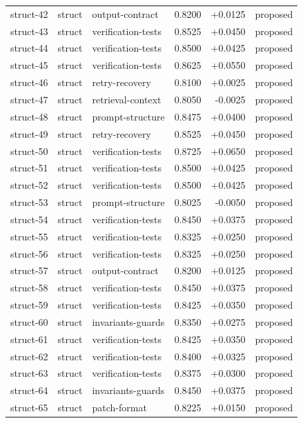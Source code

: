 \begin{center}
\begin{longtable}{llp{5.2cm}rrl}
struct-42 & struct & output-contract & 0.8200 & +0.0125 & proposed \\
struct-43 & struct & verification-tests & 0.8525 & +0.0450 & proposed \\
struct-44 & struct & verification-tests & 0.8500 & +0.0425 & proposed \\
struct-45 & struct & verification-tests & 0.8625 & +0.0550 & proposed \\
struct-46 & struct & retry-recovery & 0.8100 & +0.0025 & proposed \\
struct-47 & struct & retrieval-context & 0.8050 & -0.0025 & proposed \\
struct-48 & struct & prompt-structure & 0.8475 & +0.0400 & proposed \\
struct-49 & struct & retry-recovery & 0.8525 & +0.0450 & proposed \\
struct-50 & struct & verification-tests & 0.8725 & +0.0650 & proposed \\
struct-51 & struct & verification-tests & 0.8500 & +0.0425 & proposed \\
struct-52 & struct & verification-tests & 0.8500 & +0.0425 & proposed \\
struct-53 & struct & prompt-structure & 0.8025 & -0.0050 & proposed \\
struct-54 & struct & verification-tests & 0.8450 & +0.0375 & proposed \\
struct-55 & struct & verification-tests & 0.8325 & +0.0250 & proposed \\
struct-56 & struct & verification-tests & 0.8325 & +0.0250 & proposed \\
struct-57 & struct & output-contract & 0.8200 & +0.0125 & proposed \\
struct-58 & struct & verification-tests & 0.8450 & +0.0375 & proposed \\
struct-59 & struct & verification-tests & 0.8425 & +0.0350 & proposed \\
struct-60 & struct & invariants-guards & 0.8350 & +0.0275 & proposed \\
struct-61 & struct & verification-tests & 0.8425 & +0.0350 & proposed \\
struct-62 & struct & verification-tests & 0.8400 & +0.0325 & proposed \\
struct-63 & struct & verification-tests & 0.8375 & +0.0300 & proposed \\
struct-64 & struct & invariants-guards & 0.8450 & +0.0375 & proposed \\
struct-65 & struct & patch-format & 0.8225 & +0.0150 & proposed \\

\end{longtable}
\end{center}
